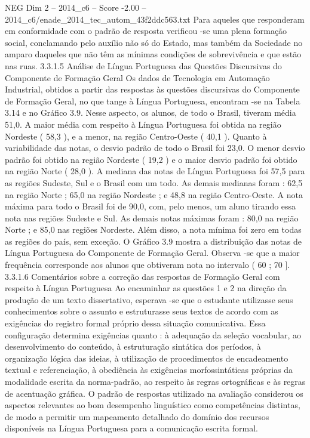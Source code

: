 \begin{textsample}{NEG Dim 2 – 2014\_c6 – Score -2.00 – 2014\_c6/enade\_2014\_tec\_autom\_43f2ddc563.txt}
Para aqueles que responderam em conformidade com o padrão de resposta verificou -se uma plena formação social, conclamando pelo auxílio não só do Estado, mas também da Sociedade no amparo daqueles que não têm as mínimas condições de sobrevivência e que estão nas ruas. 3.3.1.5 Análise de Língua Portuguesa das Questões Discursivas do Componente de Formação Geral Os dados de Tecnologia em Automação Industrial, obtidos a partir das respostas às questões discursivas do Componente de Formação Geral, no que tange à Língua Portuguesa, encontram -se na Tabela 3.14 e no Gráfico 3.9.
Nesse aspecto, os alunos, de todo o Brasil, tiveram média 51,0.
A maior média com respeito à Língua Portuguesa foi obtida na região Nordeste ( 58,3 ), e a menor, na região Centro-Oeste ( 40,1 ).
Quanto à variabilidade das notas, o desvio padrão de todo o Brasil foi 23,0.
O menor desvio padrão foi obtido na região Nordeste ( 19,2 ) e o maior desvio padrão foi obtido na região Norte ( 28,0 ).
A mediana das notas de Língua Portuguesa foi 57,5 para as regiões Sudeste, Sul e o Brasil com um todo.
As demais medianas foram : 62,5 na região Norte ; 65,0 na região Nordeste ; e 48,8 na região Centro-Oeste.
A nota máxima para todo o Brasil foi de 90,0, com, pelo menos, um aluno tirando essa nota nas regiões Sudeste e Sul.
As demais notas máximas foram : 80,0 na região Norte ; e 85,0 nas regiões Nordeste.
Além disso, a nota mínima foi zero em todas as regiões do país, sem exceção.
O Gráfico 3.9 mostra a distribuição das notas de Língua Portuguesa do Componente de Formação Geral.
Observa -se que a maior frequência corresponde aos alunos que obtiveram nota no intervalo ( 60 ; 70 ]. 3.3.1.6 Comentários sobre a correção das respostas de Formação Geral com respeito à Língua Portuguesa Ao encaminhar as questões 1 e 2 na direção da produção de um texto dissertativo, esperava -se que o estudante utilizasse seus conhecimentos sobre o assunto e estruturasse seus textos de acordo com as exigências do registro formal próprio dessa situação comunicativa.
Essa configuração determina exigências quanto : à adequação da seleção vocabular, ao desenvolvimento do conteúdo, à estruturação sintática dos períodos, à organização lógica das ideias, à utilização de procedimentos de encadeamento textual e referenciação, à obediência às exigências morfossintáticas próprias da modalidade escrita da norma-padrão, ao respeito às regras ortográficas e às regras de acentuação gráfica.
O padrão de respostas utilizado na avaliação considerou os aspectos relevantes ao bom desempenho linguístico como competências distintas, de modo a permitir um mapeamento detalhado do domínio dos recursos disponíveis na Língua Portuguesa para a comunicação escrita formal.

\end{textsample}
